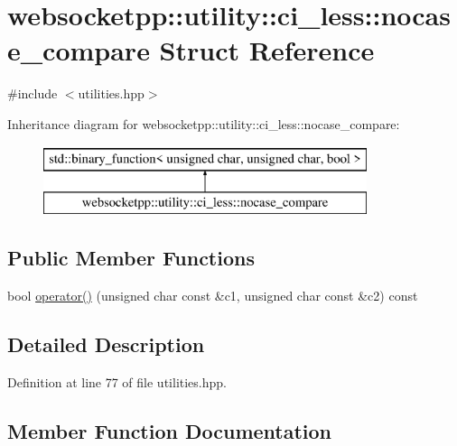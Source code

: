 \hypertarget{structwebsocketpp_1_1utility_1_1ci__less_1_1nocase__compare}{}\section{websocketpp\+:\+:utility\+:\+:ci\+\_\+less\+:\+:nocase\+\_\+compare Struct Reference}
\label{structwebsocketpp_1_1utility_1_1ci__less_1_1nocase__compare}


{\ttfamily \#include $<$utilities.\+hpp$>$}

Inheritance diagram for websocketpp\+:\+:utility\+:\+:ci\+\_\+less\+:\+:nocase\+\_\+compare\+:\begin{figure}[H]
\begin{center}
\leavevmode
\includegraphics[height=2.000000cm]{structwebsocketpp_1_1utility_1_1ci__less_1_1nocase__compare}
\end{center}
\end{figure}
\subsection*{Public Member Functions}
\begin{DoxyCompactItemize}
\item 
bool \hyperlink{structwebsocketpp_1_1utility_1_1ci__less_1_1nocase__compare_ac2cf344b42aee7f8247662175e72a271}{operator()} (unsigned char const \&c1, unsigned char const \&c2) const 
\end{DoxyCompactItemize}


\subsection{Detailed Description}


Definition at line 77 of file utilities.\+hpp.



\subsection{Member Function Documentation}
\hypertarget{structwebsocketpp_1_1utility_1_1ci__less_1_1nocase__compare_ac2cf344b42aee7f8247662175e72a271}{}
